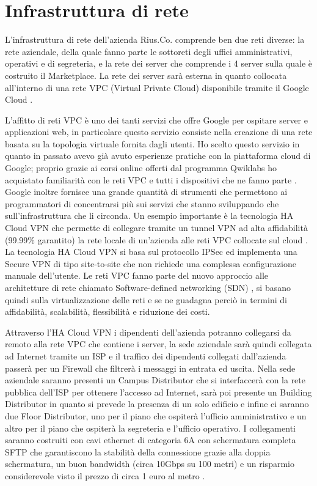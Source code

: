 \section{Infrastruttura di rete}
L'infrastruttura di rete dell'azienda Rius.Co. comprende ben due reti diverse: la rete aziendale, della quale fanno parte le sottoreti degli uffici amministrativi, operativi e di segreteria, e la rete dei server che comprende i 4 server sulla quale è costruito il Marketplace. La rete dei server sarà esterna in quanto collocata all'interno di una rete VPC (Virtual Private Cloud) disponibile tramite il Google Cloud \cite{VPC}. 
\medskip

L'affitto di reti VPC è uno dei tanti servizi che offre Google per ospitare server e applicazioni web, in particolare questo servizio consiste nella creazione di una rete basata su la topologia virtuale fornita dagli utenti. Ho scelto questo servizio in quanto in passato avevo già avuto esperienze pratiche con la piattaforma cloud di Google; proprio grazie ai corsi online offerti dal programma Qwiklabs ho acquistato familiarità con le reti VPC e tutti i dispositivi che ne fanno parte \cite{Qwiklabs}. Google inoltre fornisce una grande quantità di strumenti che permettono ai programmatori di concentrarsi più sui servizi che stanno sviluppando che sull'infrastruttura che li circonda. Un esempio importante è la tecnologia HA Cloud VPN che permette di collegare tramite un tunnel VPN ad alta affidabilità (99.99\% garantito) la rete locale di un'azienda alle reti VPC collocate sul cloud \cite{CloudVPN}. La tecnologia HA Cloud VPN si basa sul protocollo IPSec ed implementa una Secure VPN di tipo site-to-site che non richiede una complessa configurazione manuale dell'utente. Le reti VPC fanno parte del nuovo approccio alle architetture di rete chiamato Software-defined networking (SDN) \cite{SDN}, si basano quindi sulla virtualizzazione delle reti e se ne guadagna perciò in termini di affidabilità, scalabilità, flessibilità e riduzione dei costi.
\medskip

Attraverso l'HA Cloud VPN i dipendenti dell'azienda potranno collegarsi da remoto alla rete VPC che contiene i server, la sede aziendale sarà quindi collegata ad Internet tramite un ISP e il traffico dei dipendenti collegati dall'azienda passerà per un Firewall che filtrerà i messaggi in entrata ed uscita. Nella sede aziendale saranno presenti un Campus Distributor che si interfaccerà con la rete pubblica dell'ISP per ottenere l'accesso ad Internet, sarà poi presente un Building Distributor in quanto si prevede la presenza di un solo edificio e infine ci saranno due Floor Distributor, uno per il piano che ospiterà l'ufficio amministrativo e un altro per il piano che ospiterà la segreteria e l'ufficio operativo. I collegamenti saranno costruiti con cavi ethernet di categoria 6A con schermatura completa SFTP che garantiscono la stabilità della connessione grazie alla doppia schermatura, un buon bandwidth (circa 10Gbps su 100 metri) e un risparmio considerevole visto il prezzo di circa 1 euro al metro \cite{Cables}. 
